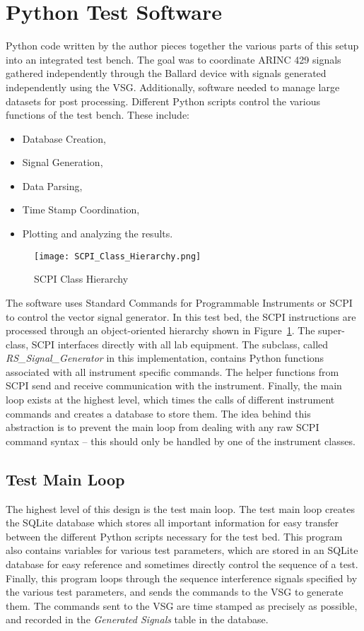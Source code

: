 \section{Python Test Software}\label{sec:Python}
Python code written by the author pieces together the various parts of this setup into an integrated test bench. The goal was to coordinate ARINC 429 signals gathered independently through the Ballard device with signals generated independently using the VSG.
Additionally, software needed to manage large datasets for post processing.
Different Python scripts control the various functions of the test bench. These include:
\begin{itemize}
\item Database Creation,
\item Signal Generation,
\item Data Parsing,
\item Time Stamp Coordination,
\item Plotting and analyzing the results.
\end{itemize}

\begin{figure}[ht]
\centering
\texttt{[image: SCPI\_Class\_Hierarchy.png]}
\caption{SCPI Class Hierarchy}
\label{fig:SCPI}
\end{figure}

The software uses Standard Commands for Programmable Instruments or SCPI to control the vector signal generator. In this test bed, the SCPI instructions are processed through an object-oriented hierarchy shown in Figure~\ref{fig:SCPI}. The super-class, SCPI interfaces directly with all lab equipment. The subclass, called \textit{RS\_Signal\_Generator} in this implementation, contains Python functions associated with all instrument specific commands. The helper functions from SCPI send and receive communication with the instrument. Finally, the main loop exists at the highest level, which times the calls of different instrument commands and creates a database to store them. The idea behind this abstraction is to prevent the main loop from dealing with any raw SCPI command syntax -- this should only be handled by one of the instrument classes. 


\subsection{Test Main Loop}\label{sub:mainloop}
The highest level of this design is the test main loop. The test main loop creates the SQLite database which stores all important information for easy transfer between the different Python scripts necessary for the test bed. This program also contains variables for various test parameters, which are stored in an SQLite database for easy reference and sometimes directly control the sequence of a test. Finally, this program loops through the sequence interference signals specified by the various test parameters, and sends the commands to the VSG to generate them. The commands sent to the VSG are time stamped as precisely as possible, and recorded in the \textit{Generated Signals} table in the database. 


